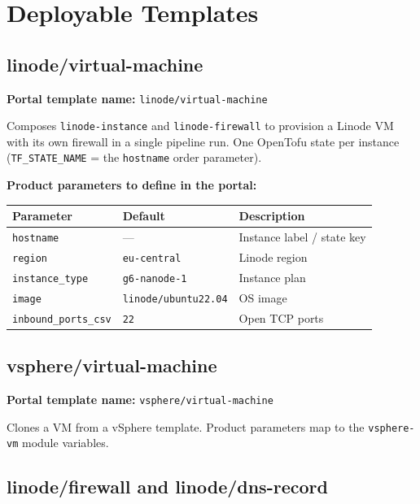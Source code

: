 \documentclass[12pt,a4paper,twoside]{report}
\newcommand{\code}[1]{\texttt{#1}}
\begin{document}
\section{Deployable Templates}

\subsection{linode/virtual-machine}

\textbf{Portal template name:} \code{linode/virtual-machine}

Composes \code{linode-instance} and \code{linode-firewall} to provision
a Linode VM with its own firewall in a single pipeline run. One
OpenTofu state per instance (\code{TF\_STATE\_NAME} = the
\code{hostname} order parameter).

\textbf{Product parameters to define in the portal:}

\begin{table}[H]
  \centering
  \begin{tabularx}{\linewidth}{@{}llX@{}}
    \toprule
    \textbf{Parameter} & \textbf{Default} & \textbf{Description} \\
    \midrule
    \code{hostname}         & —                    & Instance label / state key \\
    \code{region}           & \code{eu-central}    & Linode region \\
    \code{instance\_type}   & \code{g6-nanode-1}   & Instance plan \\
    \code{image}            & \code{linode/ubuntu22.04} & OS image \\
    \code{inbound\_ports\_csv} & \code{22}         & Open TCP ports \\
    \bottomrule
  \end{tabularx}
\end{table}

\subsection{vsphere/virtual-machine}

\textbf{Portal template name:} \code{vsphere/virtual-machine}

Clones a VM from a vSphere template. Product parameters map to the
\code{vsphere-vm} module variables.

\subsection{linode/firewall and linode/dns-record}
\end{document}
